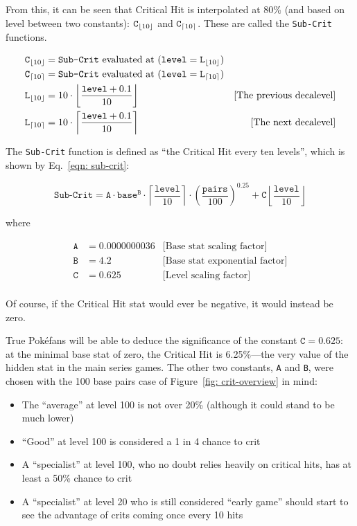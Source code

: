 \noindent From this, it can be seen that Critical Hit is interpolated at 80\% (and based on level between two constants): $\texttt{C}_{\lfloor10\rfloor}$ and $\texttt{C}_{\lceil10\rceil}$. These are called the \texttt{Sub-Crit} functions.

\begin{align*}
	\texttt{C}_{\lfloor10\rfloor} &= \texttt{Sub-Crit} \text{ evaluated at } (\texttt{level} = \texttt{L}_{\lfloor10\rfloor})\\
	\texttt{C}_{\lceil10\rceil} &= \texttt{Sub-Crit} \text{ evaluated at } (\texttt{level} = \texttt{L}_{\lceil10\rceil})\\
	\texttt{L}_{\lfloor10\rfloor} &= 10\cdot \left\lfloor \frac{\texttt{level}+0.1}{10} \right\rfloor & \text{[The previous decalevel]} \\ 
	\texttt{L}_{\lceil10\rceil} &= 10\cdot \left\lceil \frac{\texttt{level}+0.1}{10} \right\rceil & \text{[The next decalevel]}
\end{align*}

\noindent The \texttt{Sub-Crit} function is defined as ``the Critical Hit every ten levels'', which is shown by Eq.~\eqref{eqn: sub-crit}:

\begin{equation}\label{eqn: sub-crit}
	\texttt{Sub-Crit} = 	\texttt{A} \cdot \texttt{base}^\texttt{B} 
						\cdot \left\lceil \frac{\texttt{level}}{10} \right\rceil
						\cdot \left(\frac{\texttt{pairs}}{100}\right)^{0.25}
						+ \texttt{C} \left\lfloor \frac{\texttt{level}}{10} \right\rfloor						
\end{equation}

\noindent where

\begin{align*}
	\texttt{A} &= 0.0000000036 	& \text{[Base stat scaling factor]}\\
	\texttt{B} &= 4.2			& \text{[Base stat exponential factor]}\\
	\texttt{C} &= 0.625			& \text{[Level scaling factor]}\\
\end{align*}

\noindent Of course, if the Critical Hit stat would ever be negative, it would instead be zero.

True Pok\'{e}fans will be able to deduce the significance of the constant $\texttt{C} = 0.625$: at the minimal base stat of zero, the Critical Hit is 6.25\%---the very value of the hidden stat in the main series games. The other two constants, \texttt{A} and \texttt{B}, were chosen with the 100 base pairs case of Figure~\ref{fig: crit-overview} in mind:
\begin{itemize}
	\item{The ``average'' at level 100 is not over 20\% (although it could stand to be much lower)}
	\item{``Good'' at level 100 is considered a 1 in 4 chance to crit}
	\item{A ``specialist'' at level 100, who no doubt relies heavily on critical hits, has at least a 50\% chance to crit}
	\item{A ``specialist'' at level 20 who is still considered ``early game'' should start to see the advantage of crits coming once every 10 hits}
\end{itemize}

